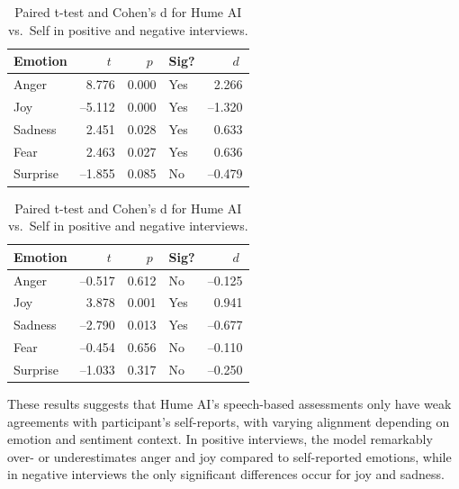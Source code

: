   \begin{table}[H]
    \centering
    \begin{subtable}{0.45\textwidth}
      \centering
      \caption{Positive Recordings}\label{tab:rq3_t_hume_self_pos}
      \begin{tabular}{l r r l r}
        \toprule
        \textbf{Emotion} & \(\;t\;\) & \(\;p\;\) & \textbf{Sig?} & \(\;d\;\) \\
        \midrule
        Anger    &  8.776 & 0.000 & Yes &  2.266 \\
        Joy      & –5.112 & 0.000 & Yes & –1.320 \\
        Sadness  &  2.451 & 0.028 & Yes &  0.633 \\
        Fear     &  2.463 & 0.027 & Yes &  0.636 \\
        Surprise & –1.855 & 0.085 & No  & –0.479 \\
        \bottomrule
      \end{tabular}
    \end{subtable}\hfill
    \begin{subtable}{0.45\textwidth}
      \centering
      \caption{Negative Recordings}\label{tab:rq3_t_hume_self_neg}
      \begin{tabular}{l r r l r}
        \toprule
        \textbf{Emotion} & \(\;t\;\) & \(\;p\;\) & \textbf{Sig?} & \(\;d\;\) \\
        \midrule
        Anger    & –0.517 & 0.612 & No  & –0.125 \\
        Joy      &  3.878 & 0.001 & Yes &  0.941 \\
        Sadness  & –2.790 & 0.013 & Yes & –0.677 \\
        Fear     & –0.454 & 0.656 & No  & –0.110 \\
        Surprise & –1.033 & 0.317 & No  & –0.250 \\
        \bottomrule
      \end{tabular}
    \end{subtable}
  
    \caption{Paired t-test and Cohen’s d for Hume AI vs.\ Self in positive and negative interviews.}
    \label{tab:rq3_t_hume_self_side_by_side}
  \end{table}
  
These results suggests that Hume AI's speech-based assessments only have weak agreements with participant's self-reports, with varying alignment depending on emotion and sentiment context. 
In positive interviews, the model remarkably over- or underestimates anger and joy compared to self-reported emotions, while in negative interviews the only significant differences occur for joy and sadness. 

